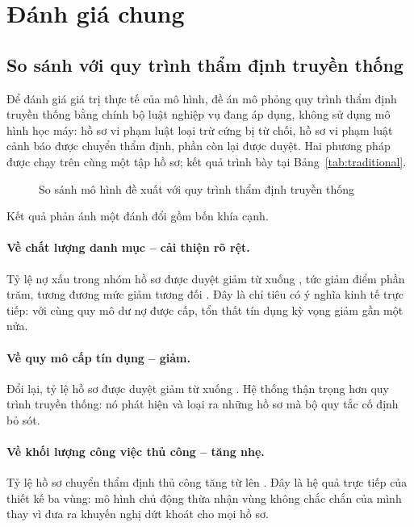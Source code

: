 \section{Đánh giá chung}
\label{sec:danh-gia-chung}

\subsection{So sánh với quy trình thẩm định truyền thống}
\label{subsec:so-sanh-truyen-thong}

Để đánh giá giá trị thực tế của mô hình, đề án mô phỏng quy trình thẩm định
truyền thống bằng chính bộ luật nghiệp vụ đang áp dụng, không sử dụng mô hình học
máy: hồ sơ vi phạm luật loại trừ cứng bị từ chối, hồ sơ vi phạm luật cảnh báo
được chuyển thẩm định, phần còn lại được duyệt. Hai phương pháp được chạy trên
cùng một tập hồ sơ; kết quả trình bày tại Bảng~\ref{tab:traditional}.



\begin{figure}[!htbp]
\centering
{}
\caption{So sánh mô hình đề xuất với quy trình thẩm định truyền thống}
\label{fig:traditional}
\end{figure}

Kết quả phản ánh một đánh đổi gồm bốn khía cạnh.

\paragraph{Về chất lượng danh mục -- cải thiện rõ rệt.} Tỷ lệ nợ xấu trong nhóm
hồ sơ được duyệt giảm từ \TradBadRate{} xuống \PropBadRate{}, tức giảm
\BadRateReduction{} điểm phần trăm, tương đương mức giảm tương đối
\BadRateReductionPct{}. Đây là chỉ tiêu có ý nghĩa kinh tế trực tiếp: với cùng
quy mô dư nợ được cấp, tổn thất tín dụng kỳ vọng giảm gần một nửa.

\paragraph{Về quy mô cấp tín dụng -- giảm.} Đổi lại, tỷ lệ hồ sơ được duyệt giảm
từ \TradApproveRate{} xuống \ApproveRate{}. Hệ thống thận trọng hơn quy trình
truyền thống: nó phát hiện và loại ra những hồ sơ mà bộ quy tắc cố định bỏ sót.

\paragraph{Về khối lượng công việc thủ công -- tăng nhẹ.} Tỷ lệ hồ sơ chuyển thẩm
định thủ công tăng từ \TradReviewRate{} lên \PropReviewRate{}. Đây là hệ quả trực
tiếp của thiết kế ba vùng: mô hình chủ động thừa nhận vùng không chắc chắn của
mình thay vì đưa ra khuyến nghị dứt khoát cho mọi hồ sơ.

